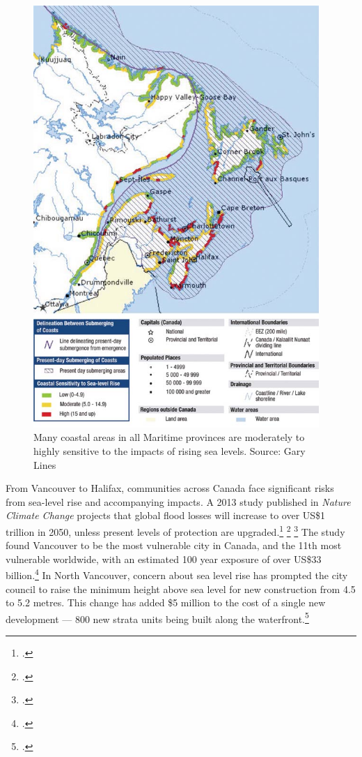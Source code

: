\documentclass[10pt]{article}
\begin{document}
\begin{figure}
\includegraphics[height=160mm]{s3-coastalsealevel.png}
\centering
\caption{Many coastal areas in all Maritime provinces are moderately to highly sensitive to the impacts of rising sea  levels. Source: Gary Lines}
\label{fig:s3-coastalsealevel}
\end{figure}



From Vancouver to Halifax, communities across Canada face significant risks from sea-level rise and accompanying impacts. 
A 2013 study published in \emph{Nature Climate Change} projects that global flood losses will increase to over US\$1 trillion in 2050, unless present levels of protection are upgraded.\footcite[][]{Hallegatte2013} \footcite[See also: ][]{Moore2013} \footcite[][]{VancouverFlooding2013}
The study found Vancouver to be the most vulnerable city in Canada, and the 11th most vulnerable worldwide, with an estimated 100 year exposure of over US\$33 billion.\footcite[][p. 2]{Hallegatte2013}
In North Vancouver, concern about sea level rise has prompted the city council to raise the minimum height above sea level for new construction from 4.5 to 5.2 metres.
This change has added \$5 million to the cost of a single new development --- 800 new strata units being built along the waterfront.\footcite[][]{RichterNorthVan2013}
\end{document}
